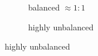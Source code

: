 \begin{frame}
\begin{figure}[ht]
     \centering
     \begin{subfigure}[t]{0.37\textwidth}
         \centering
         \usebox{\imagebox}%
         \caption{balanced $\approx 1:1$}
     \end{subfigure}
     \hspace{2mm}
     \begin{subfigure}[t]{0.37\textwidth}
         \centering
         \caption{highly unbalanced}
         \label{fig:linear}
     \end{subfigure}
\end{figure} 


\end{frame}
